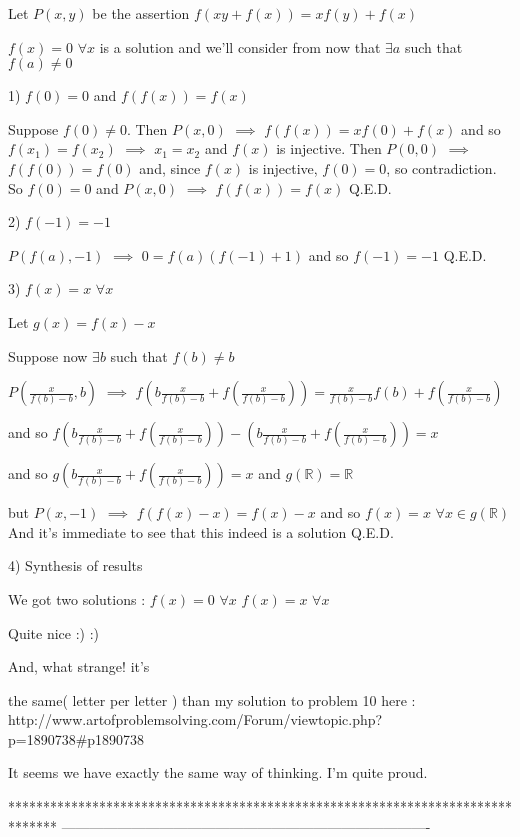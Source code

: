 \begin{solution}
	Let $P(x,y)$ be the assertion $f(xy+f(x))=xf(y)+f(x)$

$f(x)=0$ $\forall x$ is a solution and we'll consider from now that $\exists a$ such that $f(a)\ne 0$

1) $f(0)=0$ and $f(f(x))=f(x)$

Suppose $f(0)\ne 0$. Then $P(x,0)$ $\implies$ $f(f(x))=xf(0)+f(x)$ and so $f(x_1)=f(x_2)$ $\implies$ $x_1=x_2$ and $f(x)$ is injective.
Then $P(0,0)$ $\implies$ $f(f(0))=f(0)$ and, since $f(x)$ is injective, $f(0)=0$, so contradiction.
So $f(0)=0$ and $P(x,0)$ $\implies$ $f(f(x))=f(x)$
Q.E.D.

2) $f(-1)=-1$

$P(f(a),-1)$ $\implies$ $0=f(a)(f(-1)+1)$ and so $f(-1)=-1$
Q.E.D.

3) $f(x)=x$ $\forall x$

Let $g(x)=f(x)-x$

Suppose now $\exists b$ such that $f(b)\ne b$

$P(\frac x{f(b)-b},b)$ $\implies$ $f(b\frac x{f(b)-b}+f(\frac x{f(b)-b}))=\frac x{f(b)-b}f(b)+f(\frac x{f(b)-b})$

and so $f(b\frac x{f(b)-b}+f(\frac x{f(b)-b}))-(b\frac x{f(b)-b}+f(\frac x{f(b)-b}))=x$

and so $g(b\frac x{f(b)-b}+f(\frac x{f(b)-b}))=x$ and $g(\mathbb R)=\mathbb R$

but $P(x,-1)$ $\implies$ $f(f(x)-x)=f(x)-x$ and so $f(x)=x$ $\forall x\in g(\mathbb R)$ 
And it's immediate to see that this indeed is a solution
Q.E.D.

4) Synthesis of results 

We got two solutions :
$f(x)=0$ $\forall x$
$f(x)=x$ $\forall x$
\end{solution}



\begin{solution}
	Quite nice :) :)

And, what strange! it's the same( letter per letter ) than my solution to problem 10 here : 
http://www.artofproblemsolving.com/Forum/viewtopic.php?p=1890738#p1890738

It seems we have exactly the same way of thinking.
I'm quite proud.
\end{solution}
*******************************************************************************
-------------------------------------------------------------------------------

